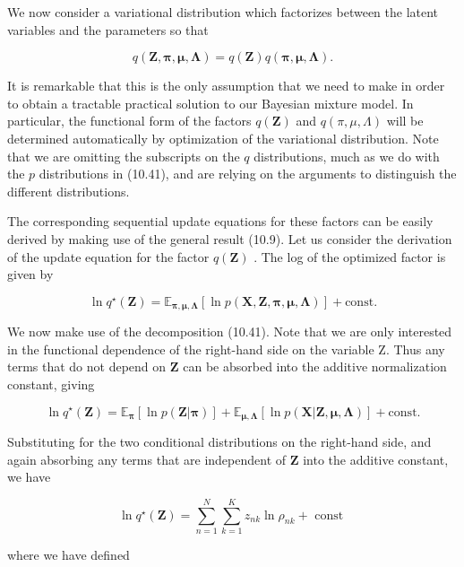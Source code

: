 \documentclass[
  10
]{article}
\begin{document}
We now consider a variational distribution which factorizes between the
latent variables and the parameters so that

\[
q (\mathbf {Z}, \boldsymbol {\pi}, \boldsymbol {\mu}, \boldsymbol {\Lambda}) = q (\mathbf {Z}) q (\boldsymbol {\pi}, \boldsymbol {\mu}, \boldsymbol {\Lambda}).\tag{10.42}
\]

It is remarkable that this is the only assumption that we need to make
in order to obtain a tractable practical solution to our Bayesian
mixture model. In particular, the functional form of the factors
\(q ( \mathbf { Z } )\) and \(q ( \pi , \mu , \Lambda )\) will be
determined automatically by optimization of the variational
distribution. Note that we are omitting the subscripts on the \(q\)
distributions, much as we do with the \(p\) distributions in (10.41),
and are relying on the arguments to distinguish the different
distributions.

The corresponding sequential update equations for these factors can be
easily derived by making use of the general result (10.9). Let us
consider the derivation of the update equation for the factor
\(q ( \mathbf { Z } )\) . The log of the optimized factor is given by

\[
\ln q ^ {\star} (\mathbf {Z}) = \mathbb {E} _ {\boldsymbol {\pi}, \boldsymbol {\mu}, \boldsymbol {\Lambda}} [ \ln p (\mathbf {X}, \mathbf {Z}, \boldsymbol {\pi}, \boldsymbol {\mu}, \boldsymbol {\Lambda}) ] + \mathrm{const}.\tag{10.43}
\]

We now make use of the decomposition (10.41). Note that we are only
interested in the functional dependence of the right-hand side on the
variable Z. Thus any terms that do not depend on \(\mathbf { Z }\) can
be absorbed into the additive normalization constant, giving

\[
\ln q ^ {\star} (\mathbf {Z}) = \mathbb {E} _ {\boldsymbol {\pi}} [ \ln p (\mathbf {Z} | \boldsymbol {\pi}) ] + \mathbb {E} _ {\boldsymbol {\mu}, \boldsymbol {\Lambda}} [ \ln p (\mathbf {X} | \mathbf {Z}, \boldsymbol {\mu}, \boldsymbol {\Lambda}) ] + \mathrm{const.}\tag{10.44}
\]

Substituting for the two conditional distributions on the right-hand
side, and again absorbing any terms that are independent of
\(\mathbf { Z }\) into the additive constant, we have

\[
\ln q ^ {\star} (\mathbf {Z}) = \sum_ {n = 1} ^ {N} \sum_ {k = 1} ^ {K} z _ {n k} \ln \rho_ {n k} + \text { const }\tag{10.45}
\]

where we have defined
\end{document}
